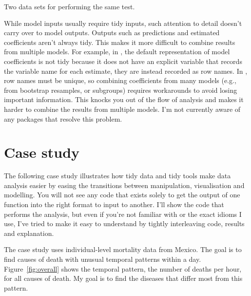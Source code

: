 \documentclass[article]{jss}
\begin{document}
\begin{table}
  \centering
  \hspace{2em}%

  \caption{Two data sets for performing the same test.}
  \label{label}
\end{table}

While model inputs usually require tidy inputs, such attention to detail doesn't carry over to model outputs. Outputs such as predictions and estimated coefficients aren't always tidy. This makes it more difficult to combine results from multiple models. For example, in , the default representation of model coefficients is not tidy because it does not have an explicit variable that records the variable name for each estimate, they are instead recorded as row names. In , row names must be unique, so combining coefficients from many models (e.g., from bootstrap resamples, or subgroups) requires workarounds to avoid losing important information. This knocks you out of the flow of analysis and makes it harder to combine the results from multiple models. I'm not currently aware of any packages that resolve this problem.

\section{Case study} 
\label{sec:case-study}

The following case study illustrates how tidy data and tidy tools make data analysis easier by easing the transitions between manipulation, visualisation and modelling. You will not see any code that exists solely to get the output of one function into the right format to input to another. I'll show the  code that performs the analysis, but even if you're not familiar with  or the exact idioms I use, I've tried to make it easy to understand by tightly interleaving code, results and explanation.

The case study uses individual-level mortality data from Mexico. The goal is to find causes of death with unusual temporal patterns within a day. Figure~\ref{fig:overall} shows the temporal pattern, the number of deaths per hour, for all causes of death. My goal is to find the diseases that differ most from this pattern.
\end{document}

